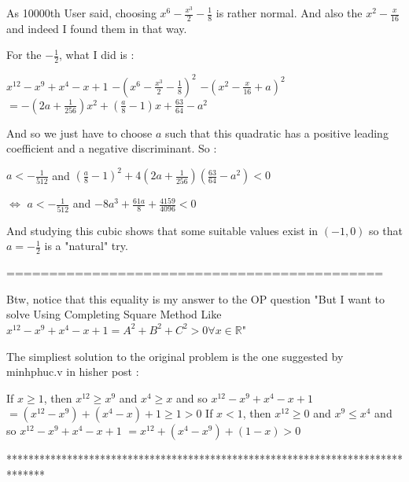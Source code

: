 \begin{solution}
	As 10000th User said, choosing $x^6-\frac {x^3}2-\frac 18$ is rather normal. And also the $x^2-\frac x{16}$ and indeed I found them in that way.

For the $-\frac 12$, what I did is :

$x^{12}-x^9+x^4-x+1$ $-\left(x^6-\frac{x^3}2-\frac 18\right)^2$ $-\left(x^2-\frac x{16}+a\right)^2$ $=-(2a+\frac 1{256})x^2+(\frac a8-1)x+\frac{63}{64}-a^2$

And so we just have to choose $a$ such that this quadratic has a positive leading coefficient and a negative discriminant. So :

$a<-\frac 1{512}$ and $(\frac a8-1)^2+4(2a+\frac 1{256})(\frac {63}{64}-a^2)<0$

$\iff$ $a<-\frac 1{512}$ and $-8a^3+\frac{61a}8+\frac{4159}{4096}<0$

And studying this cubic shows that some suitable values exist in $(-1,0)$ so that $a=-\frac 12$ is a "natural" try.

 ============================================

Btw, notice that this equality is my answer to the OP question "But I want to solve Using Completing Square Method Like $x^{12}-x^9+x^4-x+1 = A^2+B^2+C^2>0\forall x\in \mathbb{R}$"

The simpliest solution to the original problem is the one suggested by minhphuc.v in his\/her post :

If $x\ge 1$, then $x^{12}\ge x^9$ and $x^4\ge x$ and so $x^{12}-x^9+x^4-x+1$ $=(x^{12}-x^9)+(x^4-x)+1\ge 1>0$
If $x< 1$, then $x^{12}\ge 0$ and $x^9\le x^4$ and so $x^{12}-x^9+x^4-x+1$ $=x^{12}+(x^4-x^9)+(1-x)> 0$
\end{solution}
*******************************************************************************
